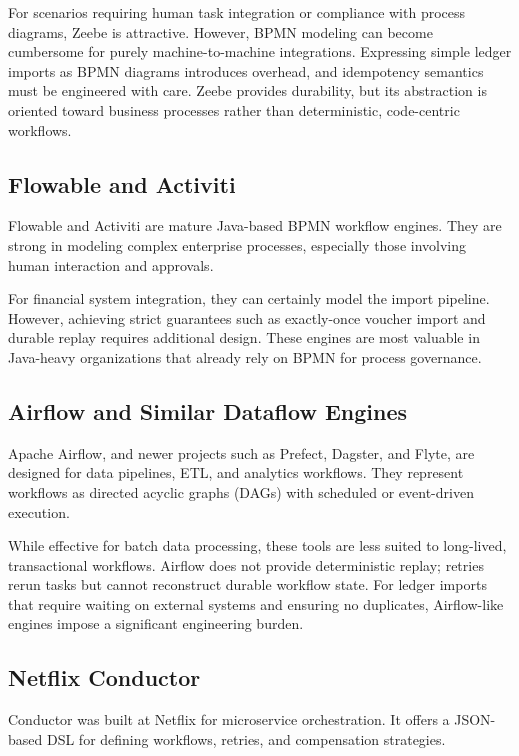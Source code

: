 \documentclass[11pt, a4paper, twocolumn]{article} %
\begin{document}
For scenarios requiring human task integration or compliance with process diagrams, Zeebe is attractive. However, BPMN modeling can become cumbersome for purely machine-to-machine integrations. Expressing simple ledger imports as BPMN diagrams introduces overhead, and idempotency semantics must be engineered with care. Zeebe provides durability, but its abstraction is oriented toward business processes rather than deterministic, code-centric workflows.

\subsection*{Flowable and Activiti}

Flowable and Activiti are mature Java-based BPMN workflow engines. They are strong in modeling complex enterprise processes, especially those involving human interaction and approvals.

For financial system integration, they can certainly model the import pipeline. However, achieving strict guarantees such as exactly-once voucher import and durable replay requires additional design. These engines are most valuable in Java-heavy organizations that already rely on BPMN for process governance.

\subsection*{Airflow and Similar Dataflow Engines}

Apache Airflow, and newer projects such as Prefect, Dagster, and Flyte, are designed for data pipelines, ETL, and analytics workflows. They represent workflows as directed acyclic graphs (DAGs) with scheduled or event-driven execution.

While effective for batch data processing, these tools are less suited to long-lived, transactional workflows. Airflow does not provide deterministic replay; retries rerun tasks but cannot reconstruct durable workflow state. For ledger imports that require waiting on external systems and ensuring no duplicates, Airflow-like engines impose a significant engineering burden.

\subsection*{Netflix Conductor}

Conductor was built at Netflix for microservice orchestration. It offers a JSON-based DSL for defining workflows, retries, and compensation strategies.
\end{document}
